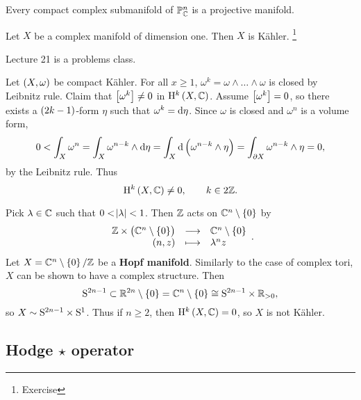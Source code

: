 \begin{fact*}
Every compact complex submanifold of $ \PP_\CC^n $ is a projective manifold.
\end{fact*}

\begin{example*}
Let $ X $ be a complex manifold of dimension one. Then $ X $ is K\"ahler. \footnote{Exercise}
\end{example*}


Lecture 21 is a problems class.

\pagebreak


Let $ \br{X, \omega} $ be compact K\"ahler. For all $ x \ge 1 $, $ \omega^k = \omega \wedge \dots \wedge \omega $ is closed by Leibnitz rule. Claim that $ \sbr{\omega^k} \ne 0 $ in $ \H^k\br{X, \CC} $. Assume $ \sbr{\omega^k} = 0 $, so there exists a $ \br{2k - 1} $-form $ \eta $ such that $ \omega^k = \d\eta $. Since $ \omega $ is closed and $ \omega^n $ is a volume form,
$$ 0 < \int_X \omega^n = \int_X \omega^{n - k} \wedge \d\eta = \int_X \d\br{\omega^{n - k} \wedge \eta} = \int_{\partial X} \omega^{n - k} \wedge \eta = 0, $$
by the Leibnitz rule. Thus
$$ \H^k\br{X, \CC} \ne 0, \qquad k \in 2\ZZ. $$

\begin{example}
Pick $ \lambda \in \CC $ such that $ 0 < \abs{\lambda} < 1 $. Then $ \ZZ $ acts on $ \CC^n \setminus \cbr{0} $ by
$$ \function{\ZZ \times \br{\CC^n \setminus \cbr{0}}}{\CC^n \setminus \cbr{0}}{\br{n, z}}{\lambda^nz}. $$
Let $ X = \CC^n \setminus \cbr{0} / \ZZ $ be a \textbf{Hopf manifold}. Similarly to the case of complex tori, $ X $ can be shown to have a complex structure. Then
$$ \S^{2n - 1} \subset \RR^{2n} \setminus \cbr{0} = \CC^n \setminus \cbr{0} \cong \S^{2n - 1} \times \RR_{> 0}, $$
so $ X \sim \S^{2n - 1} \times \S^1 $. Thus if $ n \ge 2 $, then $ \H^k\br{X, \CC} = 0 $, so $ X $ is not K\"ahler.
\end{example}

\subsection{Hodge \texorpdfstring{$ \star $}{*} operator}

